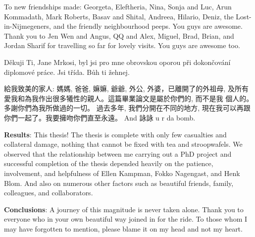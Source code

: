 \noindent To new friendships made: Georgeta, Eleftheria, Nina, Sonja and Luc, Arun Kommadath, Mark Roberts, Basav and Shital, Andreea, Hilario, Deniz, the Lost-in-Nijmegeners, and the friendly neighbourhood peeps. You guys are awesome. Thank you to Jen Wen and Angus, QQ and Alex, Miguel, Brad, Brian, and Jordan Sharif for travelling so far for lovely visits. You guys are awesome too.

\noindent D{\v e}kuji Ti, Jane Mrkosi, byl jsi pro mne obrovskou oporou p{\v r}i dokon{\v c}ov{\' a}n{\' i} diplomov{\' e} pr{\' a}ce. Jsi t{\v r}{\' i}da. B\r{u}h ti {\v z}ehnej.

\noindent
\begin{CJK}{UTF8}{bsmi}給我致美的家人: 媽媽, 爸爸, 嫲嫲, 爺爺, 外公, 外婆，已離開了的外祖母, 及所有愛我和為我作出很多犧性的親人。這篇畢業論文是屬於你們的, 而不是我 個人的。多謝你們為我所做過的一切。 過去多年, 我們分開在不同的地方, 現在我可以再跟你們一起了。我要擁吻你們直至永遠。 And 詠詠 u r da bomb.

\end{CJK}

\noindent \textbf{Results}: This thesis! The thesis is complete with only few casualties and collateral damage, nothing that cannot be fixed with tea and stroopwafels. We observed that the relationship between me carrying out a PhD project and successful completion of the thesis depended heavily on the patience, involvement, and helpfulness of Ellen Kampman, Fokko Nagengast, and Henk Blom. And also on numerous other factors such as beautiful friends, family, colleagues, and collaborators.

\noindent \textbf{Conclusions}: A journey of this magnitude is never taken alone. Thank you to everyone who in your own beautiful way joined in for the ride. To those whom I may have forgotten to mention, please blame it on my head and not my heart.